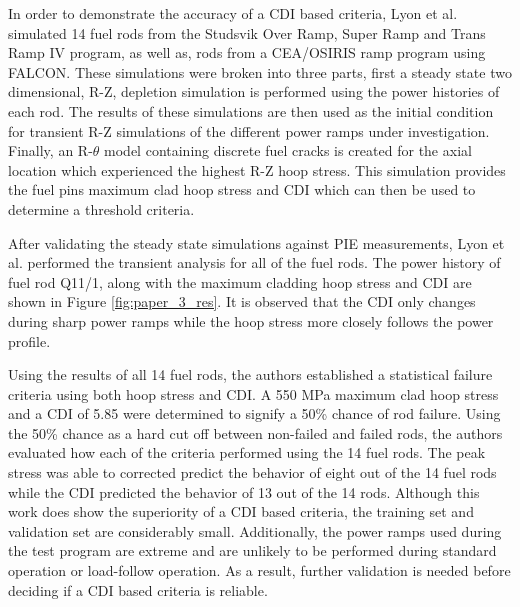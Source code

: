 \documentclass[edeposit,fullpage,11pt]{uiucthesis2009}
\begin{document}
In order to demonstrate the accuracy of a \gls{CDI} based criteria, Lyon et al. simulated 14 fuel rods from the Studsvik Over Ramp, Super Ramp and Trans Ramp IV program, as well as, rods from a CEA/OSIRIS ramp program using FALCON. %
These simulations were broken into three parts, first a steady state two dimensional, R-Z, depletion simulation is performed using the power histories of each rod.
The results of these simulations are then used as the initial condition for transient R-Z simulations of the different power ramps under investigation.
Finally, an R-$\theta$ model containing discrete fuel cracks is created for the axial location which experienced the highest R-Z hoop stress.
This simulation provides the fuel pins maximum clad hoop stress and \gls{CDI} which can then be used to determine a threshold criteria.

After validating the steady state simulations against \gls{PIE} measurements, Lyon et al. performed the transient analysis for all of the fuel rods. 
The power history of fuel rod Q11/1, along with the maximum cladding hoop stress and \gls{CDI} are shown in Figure \ref{fig:paper_3_res}.
It is observed that the \gls{CDI} only changes during sharp power ramps while the hoop stress more closely follows the power profile.

Using the results of all 14 fuel rods, the authors established a statistical failure criteria using both hoop stress and \gls{CDI}.
A 550 MPa maximum clad hoop stress  and a \gls{CDI} of 5.85 were determined to signify a 50\% chance of rod failure.
Using the 50\% chance as a hard cut off between non-failed and failed rods, the authors evaluated how each of the criteria performed using the 14 fuel rods.
The peak stress was able to corrected predict the behavior of eight out of the 14 fuel rods while the \gls{CDI} predicted the behavior of 13 out of the 14 rods.
Although this work does show the superiority of a \gls{CDI} based criteria, the training set and validation set are considerably small.
Additionally, the power ramps used during the test program are extreme and are unlikely to be performed during standard operation or load-follow operation.
As a result, further validation is needed before deciding if a \gls{CDI} based criteria is reliable.
 
\end{document}
